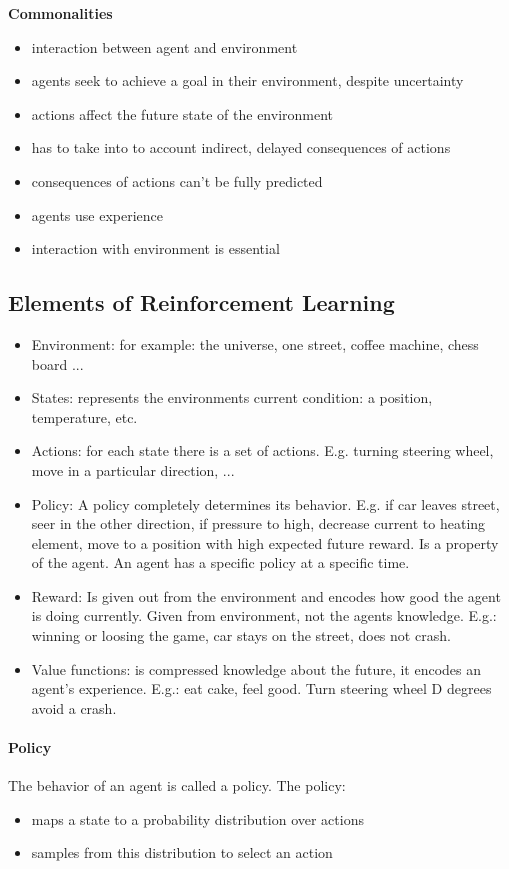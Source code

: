 \documentclass[10pt,a4paper]{article}
\begin{document}
\textbf{Commonalities}
\begin{itemize}
\item interaction between agent and environment
\item agents seek to achieve a goal in their environment, despite uncertainty
\item actions affect the future state of the environment
\item has to take into to account indirect, delayed consequences of actions
\item consequences of actions can't be fully predicted
\item agents use experience
\item interaction with environment is essential
\end{itemize}

\subsection{Elements of Reinforcement Learning}
\begin{itemize}
\item Environment: for example: the universe, one street, coffee machine, chess board ...
\item States: represents the environments current condition: a position, temperature, etc.
\item Actions: for each state there is a set of actions. E.g. turning steering wheel, move in a particular direction, ...
\item Policy: A policy completely determines its behavior. E.g. if car leaves street, seer in the other direction, if pressure to high, decrease current to heating element, move to a position with high expected future reward. Is a property of the agent. An agent has a specific policy at a specific time.
\item Reward: Is given out from the environment and encodes how good the agent is doing currently. Given from environment, not the agents knowledge. E.g.: winning or loosing the game, car stays on the street, does not crash. 
\item Value functions: is compressed knowledge about the future, it encodes an agent's experience. E.g.: eat cake, feel good. Turn steering wheel D degrees avoid a crash.
\end{itemize}

\paragraph{Policy}
The behavior of an agent is called a policy. The policy:
\begin{itemize}
\item maps a state to a probability distribution over actions
\item samples from this distribution to select an action
\end{itemize}
\end{document}
